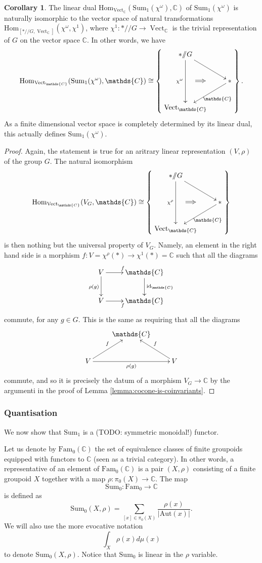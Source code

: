 \documentclass[12pt]{scrartcl}
\newcommand{\C}{\mathds{C}}
\newcommand{\Vect}{\operatorname{Vect}}
\theoremstyle{definition}
\newtheorem{corollary}[definition]{Corollary}
\numberwithin{equation}{section}
\numberwithin{definition}{section}
\numberwithin{figure}{section}
\begin{document}
\begin{corollary}
The linear dual $\mathrm{Hom}_{\Vect_\C}(\text{Sum}_1(\chi^\omega),\C)$ of $\text{Sum}_1(\chi^\omega)$ is naturally isomorphic to the vector space of natural transformations $\mathrm{Hom}_{[*/\!\!/ G,\Vect_\C]}(\chi^\omega,\chi^1)$, where $\chi^1\colon  */\!\!/ G \to \Vect_\C$ is the trivial representation of $G$ on the vector space $\C$. In other words, we have
\[
\mathrm{Hom}_{\Vect_\C}(\text{Sum}_1(\chi^\omega),\C)\cong \left\{
\raisebox{40pt}{\xymatrix{
{*}/\!\!/ G\ar[dd]_{\chi^\omega}\ar[dr]\\
&{*}\ar[dl]^{\C}\\
\Vect_\C
\ar@{=>}(5,-13);(10,-13)
}}
\right\}.
\]
As a finite dimensional vector space is completely determined by its linear dual, this actually defines $\text{Sum}_1(\chi^\omega)$.
\end{corollary}
\begin{proof}
Again, the statement is true for an aritrary linear representation $(V,\rho)$ of the group $G$. The natural isomorphism
\[
\mathrm{Hom}_{\Vect_\C}(V_G,\C)\cong \left\{
\raisebox{40pt}{\xymatrix{
{*}/\!\!/ G\ar[dd]_{\chi^\rho}\ar[dr]\\
&{*}\ar[dl]^{\C}\\
\Vect_\C
\ar@{=>}(5,-13);(10,-13)
}}
\right\}
\]
is then nothing but the universal property of $V_G$. Namely, an element in the right hand side is a morphism $f\colon V=\chi^\rho(*)\to \chi^1(*)=\C$ such that all the diagrams
\[
\xymatrix{
V\ar[d]_{\rho(g)}\ar[r]^f & \C\ar[d]^{\mathrm{id}_\C}\\
V\ar[r]_f &\C
}
\]
commute, for any $g\in G$. This is the same as requiring that all the diagrams
\[
\xymatrix{
&\C\\
V\ar[rr]_{\rho(g)}\ar[ru]^{f} &&V\ar[lu]_{f}
}
\]
commute, and so it is precisely the datum of a morphism $V_G\to \C$ by the argumenti in the proof of Lemma \ref{lemma:cocone-is-coinvariants}.
\end{proof}


\subsubsection{Quantisation}

We now show that $\textrm{Sum}_1$ is a (TODO: symmetric monoidal!) functor. 

\medskip

Let us denote by $\mathrm{Fam}_0(\mathbb{C})$ the set of equivalence classes of finite groupoids equipped with functors to $\mathbb{C}$ (seen as a trivial category). In other words, a representative of an element of $\mathrm{Fam}_0(\mathbb{C})$ is a pair $(X,\rho)$ consisting of a finite groupoid $X$ together with a map $\rho\colon \pi_0(X)\to \mathbb{C}$.
The map 
\[
\mathrm{Sum}_0\colon \mathrm{Fam}_0\to \mathbb{C}
\]
is defined as
\[
\mathrm{Sum}_0(X,\rho)=\sum_{[x]\in \pi_0(X)}\frac{\rho(x)}{|\mathrm{Aut}(x)|}.
\]
We will also use the more evocative notation
\[
\int_X \rho(x) d\mu(x)
\]
to denote $\mathrm{Sum}_0(X,\rho)$. Notice that $\mathrm{Sum}_0$ is linear in the $\rho$ variable.
\end{document}
